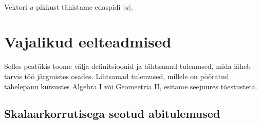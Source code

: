\documentclass[a4paper,12pt]{article}
\theoremstyle{plain}
\theoremstyle{definition}
\numberwithin{equation}{section}
\begin{document}
\paragraph{}
Vektori $u$ pikkust tähistame edaspidi $|u|$.
\newpage

\section{Vajalikud eelteadmised}

Selles peatükis toome välja definitsioonid ja tähtsamad tulemused, mida läheb tarvis töö järgmistes osades. Lihtsamad tulemused, millele on pööratud tähelepanu kursustes Algebra I või Geomeetria II, esitame seejuures tõestusteta.

\subsection{Skalaarkorrutisega seotud abitulemused}
\label{eelteadmised:skalaar}
\end{document}

